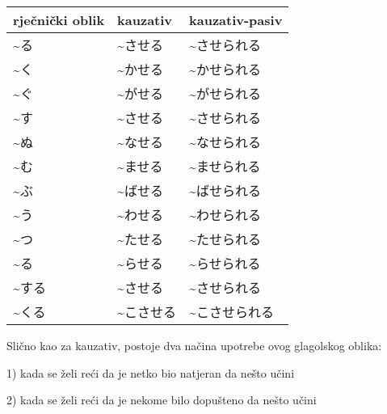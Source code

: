 	\begin{table}[h]
		\centering
		\begin{tabular}{l | l | l}\toprule[2pt]
			rječnički oblik & kauzativ & kauzativ-pasiv\\
			\midrule
			\textasciitilde る & \textasciitilde させる & \textasciitilde させられる\\
			\textasciitilde く & \textasciitilde かせる & \textasciitilde かせられる\\
			\textasciitilde ぐ & \textasciitilde がせる & \textasciitilde がせられる\\
			\textasciitilde す & \textasciitilde させる & \textasciitilde させられる\\
			\textasciitilde ぬ & \textasciitilde なせる & \textasciitilde なせられる\\
			\textasciitilde む & \textasciitilde ませる & \textasciitilde ませられる\\
			\textasciitilde ぶ & \textasciitilde ばせる & \textasciitilde ばせられる\\
			\textasciitilde う & \textasciitilde わせる & \textasciitilde わせられる\\
			\textasciitilde つ & \textasciitilde たせる & \textasciitilde たせられる\\
			\textasciitilde る & \textasciitilde らせる & \textasciitilde らせられる\\
			\textasciitilde する　& \textasciitilde させる & \textasciitilde させられる\\
			\textasciitilde くる　&\textasciitilde こさせる & \textasciitilde こさせられる\\
			\bottomrule[2pt]
		\end{tabular}
	\end{table}
	

	Slično kao za kauzativ, postoje dva načina upotrebe ovog glagolskog oblika:
	
	1) kada se želi reći da je netko bio natjeran da nešto učini
	
	2) kada se želi reći da je nekome bilo dopušteno da nešto učini
 
	\begin{reibun}
	\end{reibun}

